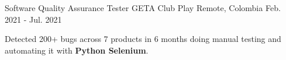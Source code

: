 \begin{cventries}
  \cventry
  {Software Quality Assurance Tester} %
  {GETA Club Play} %
  {Remote, Colombia} %
  {Feb. 2021 - Jul. 2021} %
  {
    \begin{cvitems} %
      \item {Detected 200+ bugs across 7 products in 6 months doing manual testing and automating it with \textbf{Python Selenium}.}
    \end{cvitems}
  }
\end{cventries}
